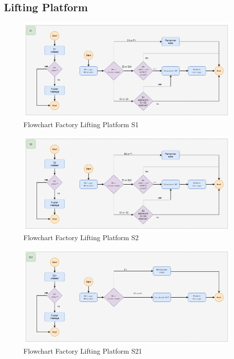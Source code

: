 \subsection*{Lifting Platform}

\begin{figure}[H]
    \centering
    \includegraphics[width=1.0\textwidth]{images/flowchart_factory_lifter_s1.png}
    \caption{Flowchart Factory Lifting Platform S1}
    \label{fig:FlowChartFactoryLifterS1}
\end{figure}

\begin{figure}[H]
    \centering
    \includegraphics[width=1.0\textwidth]{images/flowchart_factory_lifter_s2.png}
    \caption{Flowchart Factory Lifting Platform S2}
    \label{fig:FlowChartFactoryLifterS2}
\end{figure}

\begin{figure}[H]
    \centering
    \includegraphics[width=1.0\textwidth]{images/flowchart_factory_lifter_s21.png}
    \caption{Flowchart Factory Lifting Platform S21}
    \label{fig:FlowChartFactoryLifterS21}
\end{figure}

